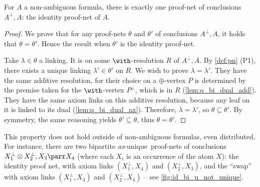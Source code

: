 \documentclass{lmcs}
\newcommand*{\orth}{^\perp} %
\newcommand*{\tens}{\otimes} %
\newcommand*{\unique}{\textit{ax}-unique}
\begin{document}
\begin{lem}
\label{lem:bi_u_non-amb-unique}
For $A$ a non-ambiguous formula, there is exactly one proof-net of conclusions $A\orth,A$: the identity proof-net of $A$.
\end{lem}
\begin{proof}
We prove that for any proof-nets $\theta$ and $\theta'$ of conclusions $A\orth,A$, it holds that $\theta=\theta'$.
Hence the result when $\theta'$ is the identity proof-net.

Take $\lambda\in\theta$ a linking.
It is on some $\with$-resolution $R$ of $A\orth,A$.
By \autoref{def:pn} (P1), there exists a unique linking $\lambda'\in\theta'$ on $R$.
We wish to prove $\lambda=\lambda'$.
They have the same additive resolution, for their choice on a $\oplus$-vertex $P$ is determined by the premise taken for the $\with$-vertex $P\orth$, which is in $R$ (\autoref{lem:q_bi_dual_add}).
They have the same axiom links on this additive resolution, because any leaf on it is linked to its dual (\autoref{lem:q_bi_dual_ax}).
Therefore, $\lambda=\lambda'$, so $\theta\subseteq\theta'$.
By symmetry, the same reasoning yields $\theta'\subseteq\theta$, thus $\theta=\theta'$.
\end{proof}

\begin{rem}
\label{rem:id_bi_u_not_unique}
This property does not hold outside of non-ambiguous formulas, even distributed.
For instance, there are two bipartite \unique\ proof-nets of conclusions $X_1\orth\tens X_2\orth, X_3\parr X_4$ (where each $X_i$ is an occurrence of the atom $X$): the identity proof net, with axiom links $(X_1\orth,X_4)$ and $(X_2\orth,X_3)$, and the ``swap'' with axiom links $(X_1\orth,X_3)$ and $(X_2\orth,X_4)$ -- see \autoref{fig:id_bi_u_not_unique}.
\end{rem}
\end{document}
